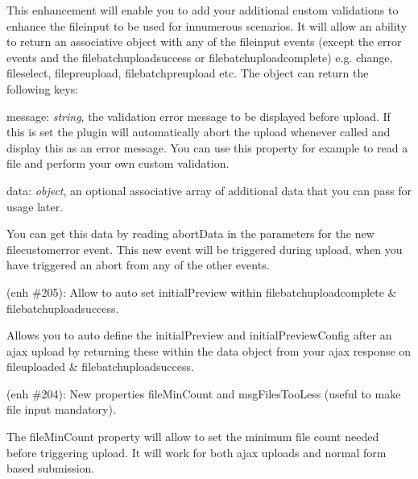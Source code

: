 \begin{DoxyItemize}
\begin{DoxyItemize}
\item This enhancement will enable you to add your additional custom validations to enhance the fileinput to be used for innumerous scenarios. It will allow an ability to return an associative object with any of the fileinput events (except the error events and the {\ttfamily filebatchuploadsuccess} or {\ttfamily filebatchuploadcomplete}) e.\+g. {\ttfamily change}, {\ttfamily fileselect}, {\ttfamily filepreupload}, {\ttfamily filebatchpreupload} etc. The object can return the following keys\+:
\begin{DoxyItemize}
\item {\ttfamily message}\+: {\itshape string}, the validation error message to be displayed before upload. If this is set the plugin will automatically abort the upload whenever called and display this as an error message. You can use this property for example to read a file and perform your own custom validation.
\item {\ttfamily data}\+: {\itshape object}, an optional associative array of additional data that you can pass for usage later.
\end{DoxyItemize}
\item You can get this data by reading {\ttfamily abort\+Data} in the parameters for the new {\ttfamily filecustomerror} event. This new event will be triggered during upload, when you have triggered an abort from any of the other events.
\end{DoxyItemize}
\item (enh \#205)\+: Allow to auto set initial\+Preview within {\ttfamily filebatchuploadcomplete} \& {\ttfamily filebatchuploadsuccess}.
\begin{DoxyItemize}
\item Allows you to auto define the {\ttfamily initial\+Preview} and {\ttfamily initial\+Preview\+Config} after an ajax upload by returning these within the data object from your ajax response on {\ttfamily fileuploaded} \& {\ttfamily filebatchuploadsuccess}.
\end{DoxyItemize}
\item (enh \#204)\+: New properties {\ttfamily file\+Min\+Count} and {\ttfamily msg\+Files\+Too\+Less} (useful to make file input mandatory).
\begin{DoxyItemize}
\item The {\ttfamily file\+Min\+Count} property will allow to set the minimum file count needed before triggering upload. It will work for both {\ttfamily ajax} uploads and {\ttfamily normal form based submission}.

\end{DoxyItemize}
\end{DoxyItemize}
